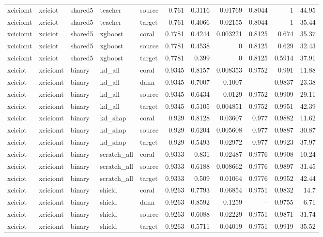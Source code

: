 \begin{table}
\begin{tabular}{lllllrrrrrr}
xciciomt & xciciot & shared5 & teacher & source & 0.761 & 0.3116 & 0.01769 & 0.8044 & 1 & 44.95 \\
xciciomt & xciciot & shared5 & teacher & target & 0.761 & 0.4066 & 0.02155 & 0.8044 & 1 & 35.44 \\
xciciomt & xciciot & shared5 & xgboost & coral & 0.7781 & 0.4244 & 0.003221 & 0.8125 & 0.674 & 35.37 \\
xciciomt & xciciot & shared5 & xgboost & source & 0.7781 & 0.4538 & 0 & 0.8125 & 0.629 & 32.43 \\
xciciomt & xciciot & shared5 & xgboost & target & 0.7781 & 0.399 & 0 & 0.8125 & 0.5914 & 37.91 \\
xciciot & xciciomt & binary & kd_all & coral & 0.9345 & 0.8157 & 0.008353 & 0.9752 & 0.991 & 11.88 \\
xciciot & xciciomt & binary & kd_all & dann & 0.9345 & 0.7007 & 0.1007 & -- & 0.9837 & 23.38 \\
xciciot & xciciomt & binary & kd_all & source & 0.9345 & 0.6434 & 0.0129 & 0.9752 & 0.9909 & 29.11 \\
xciciot & xciciomt & binary & kd_all & target & 0.9345 & 0.5105 & 0.004851 & 0.9752 & 0.9951 & 42.39 \\
xciciot & xciciomt & binary & kd_shap & coral & 0.929 & 0.8128 & 0.03607 & 0.977 & 0.9882 & 11.62 \\
xciciot & xciciomt & binary & kd_shap & source & 0.929 & 0.6204 & 0.005608 & 0.977 & 0.9887 & 30.87 \\
xciciot & xciciomt & binary & kd_shap & target & 0.929 & 0.5493 & 0.02972 & 0.977 & 0.9923 & 37.97 \\
xciciot & xciciomt & binary & scratch_all & coral & 0.9333 & 0.831 & 0.02487 & 0.9776 & 0.9908 & 10.24 \\
xciciot & xciciomt & binary & scratch_all & source & 0.9333 & 0.6188 & 0.008662 & 0.9776 & 0.9897 & 31.45 \\
xciciot & xciciomt & binary & scratch_all & target & 0.9333 & 0.509 & 0.01064 & 0.9776 & 0.9952 & 42.44 \\
xciciot & xciciomt & binary & shield & coral & 0.9263 & 0.7793 & 0.06854 & 0.9751 & 0.9832 & 14.7 \\
xciciot & xciciomt & binary & shield & dann & 0.9263 & 0.8592 & 0.1259 & -- & 0.9755 & 6.71 \\
xciciot & xciciomt & binary & shield & source & 0.9263 & 0.6088 & 0.02229 & 0.9751 & 0.9871 & 31.74 \\
xciciot & xciciomt & binary & shield & target & 0.9263 & 0.5711 & 0.04019 & 0.9751 & 0.9919 & 35.52 \\

\end{tabular}
\end{table}
